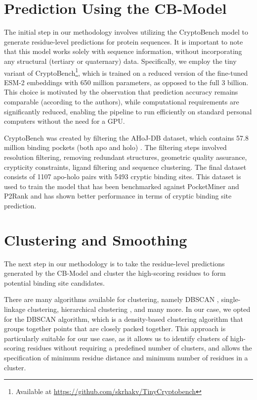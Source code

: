 \section{Prediction Using the CB-Model}
\label{sec:prediction}

The initial step in our methodology involves utilizing the CryptoBench \cite{vskrhak2025cryptobench} model to generate residue-level predictions for protein sequences. It is important to note that this model works solely with sequence information, without incorporating any structural (tertiary or quaternary) data. Specifically, we employ the tiny variant of CryptoBench\footnote{Available at \url{https://github.com/skrhakv/TinyCryptobench}}, which is trained on a reduced version of the fine-tuned ESM-2 embeddings \cite{lin2022language} with 650 million parameters, as opposed to the full 3 billion. This choice is motivated by the observation that prediction accuracy remains comparable (according to the authors), while computational requirements are significantly reduced, enabling the pipeline to run efficiently on standard personal computers without the need for a GPU.

CryptoBench was created by filtering the AHoJ-DB \cite{feidakis2024ahoj} dataset, which contains 57.8 million binding pockets (both apo and holo) \cite{apoholo-stats}. The filtering steps involved resolution filtering, removing redundant structures, geometric quality assurance, crypticity constraints, ligand filtering and sequence clustering. The final dataset consists of 1107 apo-holo pairs with 5493 cryptic binding sites. This dataset is used to train the model that has been benchmarked against PocketMiner \cite{meller2023predicting} and P2Rank \cite{krivak2018p2rank} and has shown better performance in terms of cryptic binding site prediction.


\section{Clustering and Smoothing}
\label{sec:clustering}

The next step in our methodology is to take the residue-level predictions generated by the CB-Model and cluster the high-scoring residues to form potential binding site candidates.

There are many algorithms available for clustering, namely DBSCAN \cite{schubert2017dbscan}, single-linkage clustering, hierarchical clustering \cite{jarman2020hierarchical}, and many more. In our case, we opted for the DBSCAN algorithm, which is a density-based clustering algorithm that groups together points that are closely packed together. This approach is particularly suitable for our use case, as it allows us to identify clusters of high-scoring residues without requiring a predefined number of clusters, and allows the specification of minimum residue distance and minimum number of residues in a cluster.

